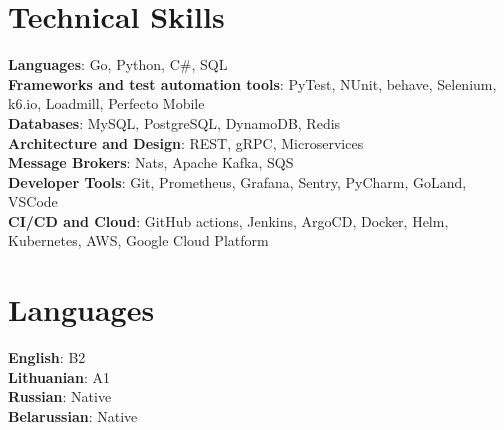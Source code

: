\documentclass[letterpaper,11pt]{article}
\begin{document}
\section{Technical Skills}
\begin{itemize}[leftmargin=0.15in, label={}]
\small{\item{
\textbf{Languages}{: Go, Python, C\#, SQL} \\
\textbf{Frameworks and test automation tools}{: PyTest, NUnit, behave, Selenium, k6.io, Loadmill, Perfecto Mobile} \\
\textbf{Databases}{: MySQL, PostgreSQL, DynamoDB, Redis}\\
\textbf{Architecture and Design}{: REST, gRPC, Microservices}\\
\textbf{Message Brokers}{: Nats, Apache Kafka, SQS}\\
\textbf{Developer Tools}{: Git, Prometheus, Grafana, Sentry, PyCharm, GoLand, VSCode} \\
\textbf{CI/CD and Cloud}{: GitHub actions, Jenkins, ArgoCD, Docker, Helm, Kubernetes, AWS, Google Cloud Platform}\\
}}
\end{itemize}


\section{Languages}
\begin{itemize}[leftmargin=0.15in, label={}]
\small{\item{
\textbf{English}{: B2 } \\
\textbf{Lithuanian}{: A1 } \\
\textbf{Russian}{: Native} \\
\textbf{Belarussian}{: Native} \\
}}
\end{itemize}
\end{document}
